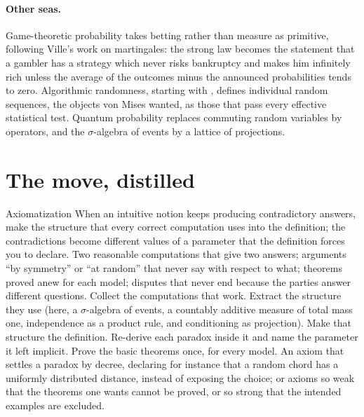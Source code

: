 \begin{refsection}
\paragraph{Other seas.} Game-theoretic probability \parencite{ShaferVovk2019} takes betting rather than measure as primitive, following Ville's work on martingales: the strong law becomes the statement that a gambler has a strategy which never risks bankruptcy and makes him infinitely rich unless the average of the outcomes minus the announced probabilities tends to zero. Algorithmic randomness, starting with \textcite{MartinLof1966}, defines individual random sequences, the objects von Mises wanted, as those that pass every effective statistical test. Quantum probability replaces commuting random variables by operators, and the $\sigma$-algebra of events by a lattice of projections.

\section{The move, distilled}\label{sec:kolmogorov:distilled}

\begin{move}{Axiomatization}
 When an intuitive notion keeps producing contradictory answers, make the structure that every correct computation uses into the definition; the contradictions become different values of a parameter that the definition forces you to declare.
 Two reasonable computations that give two answers; arguments ``by symmetry'' or ``at random'' that never say with respect to what; theorems proved anew for each model; disputes that never end because the parties answer different questions.
 Collect the computations that work. Extract the structure they use (here, a $\sigma$-algebra of events, a countably additive measure of total mass one, independence as a product rule, and conditioning as projection). Make that structure the definition. Re-derive each paradox inside it and name the parameter it left implicit. Prove the basic theorems once, for every model.
 An axiom that settles a paradox by decree, declaring for instance that a random chord has a uniformly distributed distance, instead of exposing the choice; or axioms so weak that the theorems one wants cannot be proved, or so strong that the intended examples are excluded.
\end{move}



\end{refsection}
